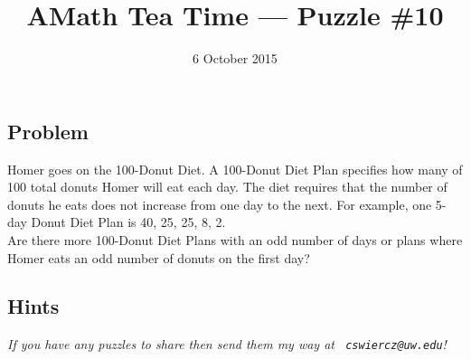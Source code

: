 \documentclass[12pt]{article}
\title{AMath Tea Time --- Puzzle \#10}
\author{}
\date{\vspace{-1cm}6 October 2015}
\begin{document}
\maketitle
{}

\subsection*{Problem}

\noindent Homer goes on the 100-Donut Diet. A 100-Donut Diet Plan specifies how
many of 100 total donuts Homer will eat each day. The diet requires that the
number of donuts he eats does not increase from one day to the next. For
example, one 5-day Donut Diet Plan is 40, 25, 25, 8, 2. \\

\noindent Are there more 100-Donut Diet Plans with an odd number of days or
plans where Homer eats an odd number of donuts on the first day?


\subsection*{Hints}

{
\par\vspace*{\fill}
\noindent \small \it
If you have any puzzles to share then send them my way at {\tt
  cswiercz@uw.edu}!
}
\end{document}
